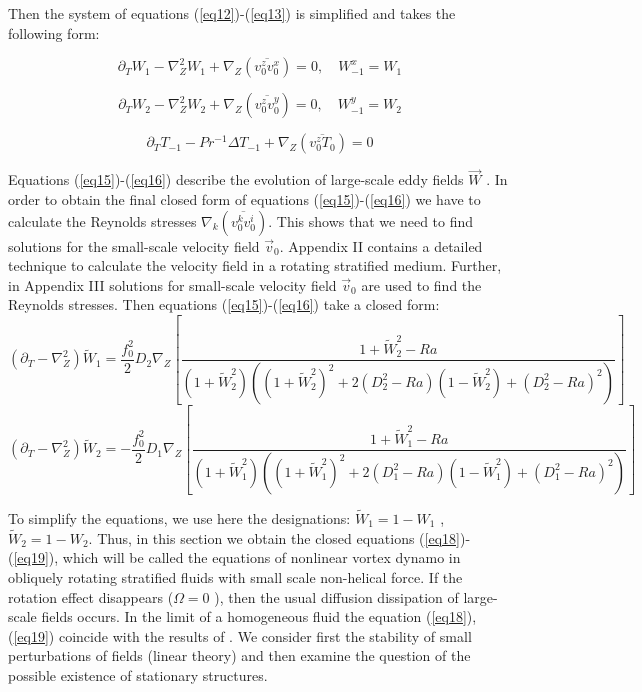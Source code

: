 \documentclass [12pt]{article}
\begin{document}
Then the system of equations (\ref{eq12})-(\ref{eq13}) is simplified and takes the following form:

\begin{equation} \label{eq15} \partial _{T} W_{1} -\nabla _{{ Z}}^{2}
W_{1} +\nabla _{Z} \left(\overline{v_{0}^{z} v_{0}^{x} }\right)=0, \quad  W_{-1}^{x}
=W_{1}  \end{equation}

\begin{equation} \label{eq16} \partial _{T} W_{2} -\nabla _{{ Z}}^{2}
W_{2} +\nabla _{Z} \left(\overline{v_{0}^{z} v_{0}^{y} }\right)=0, \quad W_{-1}^{y} =W_{2}  \end{equation}

\begin{equation}
\label{eq17} \partial _{T} T_{-1} -Pr^{-1} { \Delta T}_{-1} +\nabla _{{
Z}} \left(\overline{{ v}_{0}^{{ z}} { T}_{0} }\right)=0 \end{equation}

Equations (\ref{eq15})-(\ref{eq16}) describe the evolution of large-scale eddy fields $\vec{W}$ . In order to obtain the final closed form of equations (\ref{eq15})-(\ref{eq16}) we have to calculate the Reynolds stresses $\nabla _{k} \left(\overline{v_{0}^{k} v_{0}^{i} }\right)$. This shows that we need to find solutions for the small-scale velocity field  $\vec{v}_{0} $. Appendix II contains a detailed technique to calculate the velocity field in a rotating stratified medium. Further, in Appendix III solutions for small-scale velocity field $\vec{v}_{0} $ are used to find the Reynolds stresses. Then equations (\ref{eq15})-(\ref{eq16}) take a closed form:
\begin{equation}\label{eq18}
(\partial _T  - \nabla _Z^2 )\widetilde W_1  = \frac{{f_0^2 }}{2}D_2 \nabla _Z \left[ {\frac{{1 + \widetilde W_2^2  - Ra}}{{(1 + \widetilde W_2^2 )((1 + \widetilde W_2^2 )^2  + 2(D_2^2  - Ra)(1 - \widetilde W_2^2 ) + (D_2^2  - Ra)^2 )}}} \right] \end{equation}
\begin{equation}\label{eq19}
(\partial _T  - \nabla _Z^2 )\widetilde W_2  = -\frac{{f_0^2 }}{2}D_1 \nabla _Z \left[ {\frac{{1 + \widetilde W_1^2  - Ra}}{{(1 + \widetilde W_1^2 )((1 + \widetilde W_1^2 )^2  + 2(D_1^2  - Ra)(1 - \widetilde W_1^2 ) + (D_1^2  - Ra)^2 )}}} \right] \end{equation}




To simplify  the equations, we use here the designations: $\widetilde{W}_{1} =1-W_{1} $ , $\widetilde{W}_{2} =1-W_{2} $. Thus, in this section we obtain the closed equations (\ref{eq18})-(\ref{eq19}), which will be called the equations of nonlinear vortex dynamo in obliquely rotating stratified fluids with small scale non-helical force. If the rotation effect disappears ($\Omega =0$ ), then the usual diffusion dissipation of large-scale fields occurs. In the limit of a homogeneous fluid the equation (\ref{eq18}), (\ref{eq19}) coincide with the results of \cite{21s}. We consider first the stability of small perturbations of fields (linear theory) and then examine the question of the possible existence of stationary structures.
\end{document}
